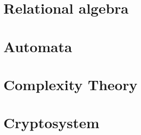\documentclass{report}
\theoremstyle{definition}
\begin{document}
		\chapter{Relational algebra}
			
		
		\chapter{Automata}
			
		
		\chapter{Complexity Theory}
			
		
		\chapter{Cryptosystem}
			
\end{document}
